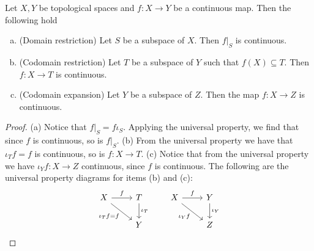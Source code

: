 \begin{corollary}\label{cor: subspace maps properties}
Let \(X, Y\) be topological spaces and \(f: X \to Y\) be a continuous map.
Then the following hold
\begin{enumerate}[(a)]\setlength\itemsep{0em}
  \item (Domain restriction) Let \(S\) be a subspace of \(X\). Then \(f|_S\)
    is continuous.
  \item (Codomain restriction) Let \(T\) be a subspace of \(Y\) such that
    \(f(X) \subseteq T\). Then \(f: X \to T\) is continuous.
  \item (Codomain expansion) Let \(Y\) be a subspace of \(Z\). Then the map
    \(f : X \to Z\) is continuous.
\end{enumerate}
\end{corollary}

\begin{proof}
(a) Notice that \(f|_S = f  \iota_S\). Applying the universal property,
we find that since \(f\) is continuous, so is \(f|_S\). (b) From the universal
property we have that \(\iota_T  f = f\) is continuous, so is \(f: X \to
T\). (c) Notice that from the universal property we have \(\iota_Y  f: X
\to Z\) continuous, since \(f\) is continuous. The following are the universal
property diagrams for items (b) and (c):
\[
  \begin{tikzcd}
    X \rar["f"] \ar[rd, swap, "\iota_T  f = f"] &T \dar["\iota_T"] \\ &Y
  \end{tikzcd}
  \qquad
  \begin{tikzcd}
    X \rar["f"] \ar[rd, swap, "\iota_Y  f"] &Y \dar["\iota_Y"] \\ &Z
  \end{tikzcd}
\]
\end{proof}


